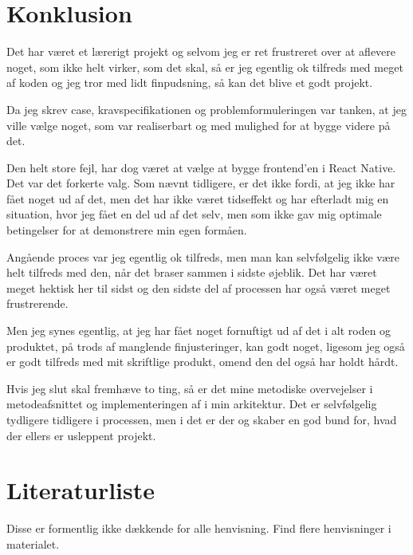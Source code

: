 \documentclass{report}
\begin{document}
\chapter{Konklusion}

Det har været et lærerigt projekt og selvom jeg er ret frustreret over at aflevere noget, som ikke helt virker, som det skal, så er jeg egentlig ok tilfreds med meget af koden og jeg tror med lidt finpudsning, så kan det blive et godt projekt.\par{}
Da jeg skrev case, kravspecifikationen og problemformuleringen var tanken, at jeg ville vælge noget, som var realiserbart og med mulighed for at bygge videre på det. \par{}
Den helt store fejl, har dog været at vælge at bygge frontend’en i React Native. Det var det forkerte valg. Som nævnt tidligere, er det ikke fordi, at jeg ikke har fået noget ud af det, men det har ikke været tidseffekt og har efterladt mig en situation, hvor jeg fået en del ud af det selv, men som ikke gav mig optimale betingelser for at demonstrere min egen formåen.\par{}
Angående proces var jeg egentlig ok tilfreds, men man kan selvfølgelig ikke være helt tilfreds med den, når det braser sammen i sidste øjeblik. Det har været meget hektisk her til sidst og den sidste del af processen har også været meget frustrerende.\par{}
Men jeg synes egentlig, at jeg har fået noget fornuftigt ud af det i alt roden og produktet, på trods af manglende finjusteringer, kan godt noget, ligesom jeg også er godt tilfreds med mit skriftlige produkt, omend den del også har holdt hårdt.\par{}
Hvis jeg slut skal fremhæve to ting, så er det mine metodiske overvejelser i metodeafsnittet og implementeringen af i min arkitektur. Det er selvfølgelig tydligere tidligere i processen, men i det er der og skaber en god bund for, hvad der ellers er usleppent projekt.

\clearpage

\appendix
\renewcommand{\thechapter}{\Alph{chapter}}

\chapter{Literaturliste}

Disse er formentlig ikke dækkende for alle henvisning. Find flere henvisninger i materialet.
\end{document}

